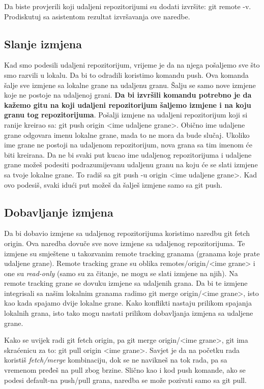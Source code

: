 \documentclass[11pt,a4paper]{article}
\begin{document}
Da biste provjerili koji udaljeni repozitorijumi su dodati izvršite: git
remote -v. Prodiskutuj sa asistentom rezultat izvršavanja ove naredbe.

\subsection{Slanje izmjena}

Kad smo podesili udaljeni repozitorijum, vrijeme je da na njega
pošaljemo sve što smo razvili u lokalu. Da bi to odradili koristimo
komandu push. Ova komanda šalje sve izmjene sa lokalne grane na udaljenu
granu. Šalju se samo nove izmjene koje ne postoje na udaljenoj grani.
\textbf{Da bi izvršili komandu potrebno je da kažemo gitu na koji
udaljeni repozitorijum šaljemo izmjene i na koju granu tog
repozitorijuma}. Pošalji izmjene na udaljeni repozitorijum koji si
ranije kreirao sa: git push origin \textless ime udaljene
grane\textgreater. Obično ime udaljene grane odgovara imenu lokalne
grane, mada to ne mora da bude slučaj. Ukoliko ime grane ne postoji na
udaljenom repozitorijum, nova grana sa tim imenom će biti kreirana. Da
ne bi svaki put kucao ime udaljenog repozitorijuma i udaljene grane
možeš podesiti podrazumijevanu udaljenu granu na koju će se slati
izmjene sa tvoje lokalne grane. To radiš sa git push -u origin
\textless ime udaljene grane\textgreater. Kad ovo podesiš, svaki idući
put možeš da šalješ izmjene samo sa git push.

\subsection{Dobavljanje izmjena}

Da bi dobavio izmjene sa udaljenog repozitorijuma koristimo naredbu git
fetch origin. Ova naredba dovuče sve nove izmjene sa udaljenog
repozitorijuma. Te izmjene su smještene u takozvanim remote tracking
granama (granama koje prate udaljene grane). Remote tracking grane su
oblika remotes/origin/\textless ime grane\textgreater{} i one su
\emph{read-only} (samo su za čitanje, ne mogu se slati izmjene na njih).
Na remote tracking grane se dovuku izmjene sa udaljenih grana. Da bi te
izmjene integrisali sa našim lokalnim granama radimo git merge
origin/\textless ime grane\textgreater, isto kao kada spajamo dvije
lokalne grane. Kako konflikti nastaju prilikom spajanja lokalnih grana,
isto tako mogu nastati prilikom dobavljanja izmjena sa udaljene grane.

Kako se uvijek radi git fetch origin, pa git merge origin/\textless ime
grane\textgreater, git ima skraćenicu za to: git pull origin
\textless ime grane\textgreater. Savjet je da na početku rada koristiš
\emph{fetch/merge} kombinaciju, dok se ne navikneš na tok rada, pa sa
vremenom pređeš na pull zbog brzine. Slično kao i kod push komande, ako
se podesi default-na push/pull grana, naredba se može pozivati samo sa
git pull.
\end{document}
